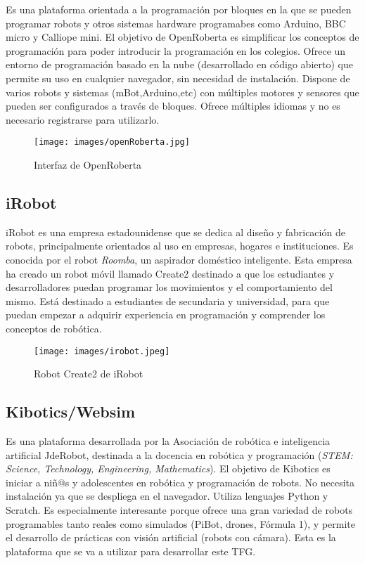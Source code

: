 \documentclass{report}
\begin{document}
Es una plataforma orientada a la programación por bloques en la que se pueden programar robots y otros sistemas hardware programabes como Arduino, BBC micro y Calliope mini. El objetivo de OpenRoberta es simplificar los conceptos de programación para poder introducir la programación en los colegios. Ofrece un entorno de programación basado en la nube (desarrollado en código abierto) que permite su uso en cualquier navegador, sin necesidad de instalación. Dispone de varios robots y sistemas (mBot,Arduino,etc) con múltiples motores y sensores que pueden ser configurados a través de bloques. Ofrece múltiples idiomas y no es necesario registrarse para utilizarlo.

\begin{figure}[h]
	\centering
	 \texttt{[image: images/openRoberta.jpg]}
	 \caption{Interfaz de OpenRoberta}
\end{figure}


\subsection{iRobot}

iRobot es una empresa estadounidense que se dedica al diseño y fabricación de robots, principalmente orientados al uso en empresas, hogares e instituciones. Es conocida por el robot \textit{Roomba}, un aspirador doméstico inteligente. Esta empresa ha creado un robot móvil llamado Create2 destinado a que los estudiantes y desarrolladores puedan programar los movimientos y el comportamiento del mismo. Está destinado a estudiantes de secundaria y universidad, para que puedan empezar a adquirir experiencia en programación y comprender los conceptos de robótica.

\begin{figure}[h]
	\centering
	 \texttt{[image: images/irobot.jpeg]}
	 \caption{Robot Create2 de iRobot}
\end{figure}

\subsection{Kibotics/Websim}

Es una plataforma desarrollada por la Asociación de robótica e inteligencia artificial JdeRobot, destinada a la docencia en robótica y programación (\textit{STEM: Science, Technology, Engineering, Mathematics}). El objetivo de Kibotics es iniciar a niñ@s y adolescentes en robótica y programación de robots. No necesita instalación ya que se despliega en el navegador. Utiliza lenguajes Python y Scratch. Es especialmente interesante porque ofrece una gran variedad de robots programables tanto reales como simulados (PiBot, drones, Fórmula 1), y permite el desarrollo de prácticas con visión artificial (robots con cámara). Esta es la plataforma que se va a utilizar para desarrollar este TFG.
\end{document}
